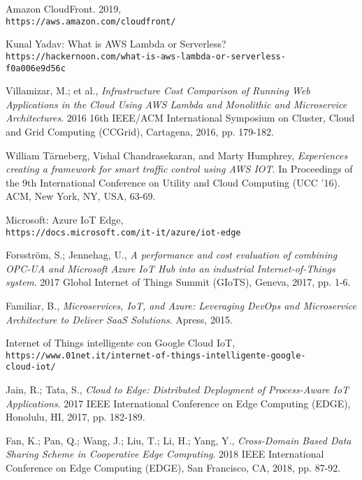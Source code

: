 \documentclass[a4paper,12pt,oneside]{book}
\begin{document}
\begin{thebibliography}{9}
	Amazon CloudFront. 2019,
	\\\texttt{https://aws.amazon.com/cloudfront/}
	
	Kunal Yadav: What is AWS Lambda or Serverless?
	\\\texttt{https://hackernoon.com/what-is-aws-lambda-or-serverless-\\f0a006e9d56c}

	
	Villamizar, M.; et al., 
	\textit{Infrastructure Cost Comparison of Running Web Applications in the Cloud Using AWS Lambda and Monolithic and Microservice Architectures}. 
	2016 16th IEEE/ACM International Symposium on Cluster, Cloud and Grid Computing (CCGrid), Cartagena, 2016, pp. 179-182.
	
	William Tärneberg, Vishal Chandrasekaran, and Marty Humphrey, 
	\textit{Experiences creating a framework for smart traffic control using AWS IOT}. 
	In Proceedings of the 9th International Conference on Utility and Cloud Computing (UCC '16). ACM, New York, NY, USA, 63-69.
	
	Microsoft: Azure IoT Edge,
	\\\texttt{https://docs.microsoft.com/it-it/azure/iot-edge}
	
	Forsström, S.; Jennehag, U., 
	\textit{A performance and cost evaluation of combining OPC-UA and Microsoft Azure IoT Hub into an industrial Internet-of-Things system}. 
	2017 Global Internet of Things Summit (GIoTS), Geneva, 2017, pp. 1-6.
	
	Familiar, B., 
	\textit{Microservices, IoT, and Azure: Leveraging DevOps and Microservice Architecture to Deliver SaaS Solutions}. 
	Apress, 2015.
	
	Internet of Things intelligente con Google Cloud IoT,
	\\\texttt{https://www.01net.it/internet-of-things-intelligente-google-\\cloud-iot/}
	
	Jain, R.; Tata, S., 
	\textit{Cloud to Edge: Distributed Deployment of Process-Aware IoT Applications}. 
	2017 IEEE International Conference on Edge Computing (EDGE), Honolulu, HI, 2017, pp. 182-189.
	
	Fan, K.; Pan, Q.; Wang, J.; Liu, T.; Li, H.; Yang, Y., 
	\textit{Cross-Domain Based Data Sharing Scheme in Cooperative Edge Computing}. 
	2018 IEEE International Conference on Edge Computing (EDGE), San Francisco, CA, 2018, pp. 87-92.
	

\end{thebibliography}
\end{document}
